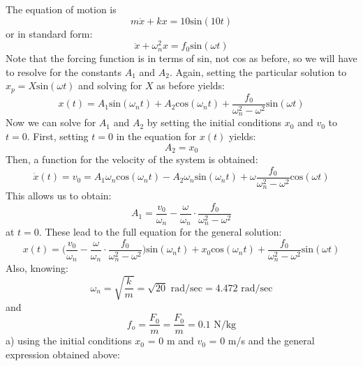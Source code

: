 \documentclass[12pt,letter]{article}
\begin{document}
\begin{example}
	The equation of motion is
	\begin{equation}
		m\ddot{x}+kx=10\text{sin}(10t)
	\end{equation}
	or in standard form:
	\begin{equation}
		\ddot{x}+\omega_n^2x=f_0\text{sin}(\omega t)
	\end{equation}							
	Note that the forcing function is in terms of sin, not cos as before, so we will have to resolve for the constants $A_1$ and $A_2$. Again, setting the particular solution to $x_p=X\text{sin}(\omega t)$ and solving for $X$ as before yields:
	\begin{equation}
		x(t) = A_1\text{sin}(\omega_n t) + A_2\text{cos}(\omega_n t) + \frac{f_0}{\omega_n^2-\omega^2}\text{sin}(\omega t)
	\end{equation}	
	Now we can solve for $A_1$ and $A_2$ by setting the initial conditions $x_0$ and $v_0$ to $t=0$. First, setting $t=0$ in the equation for $x(t)$ yields:
	\begin{equation}
		A_2 = x_0
	\end{equation}	
	Then, a function for the velocity of the system is obtained: 
	\begin{equation}
		\dot{x}(t) = v_0 = A_1\omega_n\text{cos}(\omega_n t) - A_2\omega_n\text{sin}(\omega_n t) + \omega\frac{f_0}{\omega_n^2-\omega^2}\text{cos}(\omega t)
	\end{equation}				
	This allows us to obtain:
	\begin{equation}
		A_1 = \frac{v_0}{\omega_n}-\frac{\omega}{\omega_n}\cdot \frac{f_0}{\omega_n^2-\omega^2}
	\end{equation}	
	at $t=0$. These lead to the full equation for the general solution:
	\begin{equation}
		x(t) = \Big(\frac{v_0}{\omega_n}-\frac{\omega}{\omega_n}\cdot \frac{f_0}{\omega_n^2-\omega^2}\Big)\text{sin}(\omega_n t) + x_0\text{cos}(\omega_n t) + \frac{f_0}{\omega_n^2-\omega^2}\text{sin}(\omega t)
	\end{equation}								
	Also, knowing:
	\begin{equation}
		\omega_n = \sqrt{\frac{k}{m}} = \sqrt{20} \text{ rad/sec} =  4.472 \text{ rad/sec}
	\end{equation}				
	and
	\begin{equation}
		f_o = \frac{F_0}{m} = \frac{F_0}{m} = 0.1 \text{ N/kg}
	\end{equation}	
	a) using the initial conditions $x_0$ = 0 m and $v_0$ = 0 m/s and the general expression obtained above:
	\begin{equation}

\end{equation}
\end{example}
\end{document}
